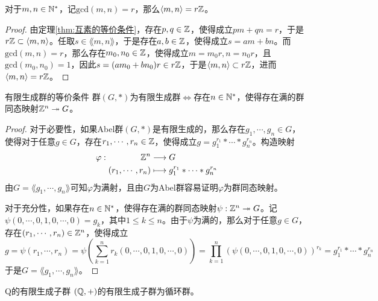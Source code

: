 \begin{proposition}
	对于$m,n\in\mathbb{N}^*$，记$\mathrm{gcd}(m,n)=r$，那么$\langle m,n \rangle=r\mathbb{Z}$。
\end{proposition}

\begin{proof}
	由定理\ref{thm:互素的等价条件}，存在$p,q\in\mathbb{Z}$，使得成立$pm+qn=r$，于是$r\mathbb{Z} \subset \langle m,n \rangle$。任取$s\in \lang m,n \rang$，于是存在$a,b\in\mathbb{Z}$，使得成立$s=am+bn$。而$\mathrm{gcd}(m,n)=r$，那么存在$m_0,n_0\in\mathbb{Z}$，使得成立$m=m_0r,n=n_0r$，且$\mathrm{gcd}(m_0,n_0)=1$，因此$s=(am_0+bn_0)r\in r\mathbb{Z}$，于是$\langle m,n \rangle \subset r\mathbb{Z}$，进而$\langle m,n \rangle=r\mathbb{Z}$。
\end{proof}

\begin{proposition}{有限生成群的等价条件}
	群$(G,*)$为有限生成群$\iff$存在$n\in\mathbb{N}^*$，使得存在满的群同态映射$\mathbb{Z}^n\twoheadrightarrow G$。
\end{proposition}

\begin{proof}
	对于必要性，如果Abel群$(G,*)$是有限生成的，那么存在$g_1,\cdots,g_n\in G$，使得对于任意$g\in G$，存在$r_1,\cdots,r_n\in\mathbb{Z}$，使得成立$g=g_1^{r_1}*\cdots*g_n^{r_n}$。构造映射
	\begin{align*}
		\varphi:\begin{aligned}[t]
			\mathbb{Z}^n&\longrightarrow G\\
			(r_1,\cdots,r_n)&\longmapsto g_1^{r_1}*\cdots*g_n^{r_n}
		\end{aligned}
	\end{align*}
	由$G=\lang g_1,\cdots,g_n \rang$可知$\varphi$为满射，且由$G$为Abel群容易证明$\varphi$为群同态映射。
	
	对于充分性，如果存在$n\in\mathbb{N}^*$，使得存在满的群同态映射$\psi:\mathbb{Z}^n\twoheadrightarrow G$。记$\psi(0,\cdots,0,1,0,\cdots,0)=g_k$，其中$1\le k \le n$。由于$\psi$为满的，那么对于任意$g\in G$，存在$(r_1,\cdots,r_n)\in\mathbb{Z}^n$，使得成立
	$$
	g=\psi(r_1,\cdots,r_n)=\psi\left(\sum_{k=1}^{n}r_k(0,\cdots,0,1,0,\cdots,0)\right)=\prod_{k=1}^{n}(\psi(0,\cdots,0,1,0,\cdots,0))^{r_k}=g_1^{r_1}*\cdots*g_n^{r_n}
	$$
	于是$G=\lang g_1,\cdots,g_n \rang$。
\end{proof}

\begin{proposition}{}{Q的有限生成子群}
	$(\mathbb{Q},+)$的有限生成子群为循环群。
\end{proposition}

